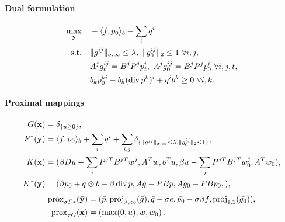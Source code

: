 \paragraph{Dual formulation}
\begin{align*}
    \max_{\mathbf{y}} \quad
        & - \langle f, p_0 \rangle_b - \sum_i q^i \\
    \text{s.t.}\quad
        & \|g^{ij}\|_{\sigma,\infty} \leq \lambda,~
          \|g_0^{ij}\|_{2} \leq 1 ~\forall i,j, \\
        & A^j g^{ij}_t = B^j P^j p^i_t,~
          A^j g_0^{ij} = B^j P^j p_0^i ~\forall i,j,t, \\
        & b_k p_0^{ki} - b_k (\operatorname{div} p^k)^i + q^i b^k \geq 0 ~\forall i, k.
\end{align*}

\paragraph{Proximal mappings}
\begin{align*}
    G(\mathbf{x}) &= \delta_{\{u \geq 0\}}, \\
    F^*(\mathbf{y}) &= \langle f, p_0 \rangle_b + \sum_{i} q^i
        + \sum_{i,j} \delta_{\{
            \|g^{ij}\|_{\sigma,\infty} \leq \lambda,
            \|g_0^{ij}\|_{2} \leq 1
        \}}, \\
    K(\mathbf{x}) &= (
        \beta Du - \sum_j P^{jT}B^{jT}w^{j},
        A^T w,
        b^T u,
        \beta u - \sum_j P^{jT}B^{jT}w_0^{j},
        A^T w_0
    ), \\
    K^*(\mathbf{y}) &= (
        \beta p_0 + q \otimes b - \beta \operatorname{div}{p},
        A g - PBp,
        A g_0 - PB p_0,
    ),
\end{align*}
\begin{align*}
    \operatorname{prox}_{\sigma F*}(\bar{\mathbf{y}})
    &= (
        \bar{p},
        \operatorname{proj}_{\lambda,\infty}(\bar{g}),
        \bar{q}-\sigma e,
        \bar{p_0} - \sigma \beta f,
        \operatorname{proj}_{1,2}(\bar{g_0})
    ), \\
    \operatorname{prox}_{\tau G}(\bar{\mathbf{x}})
    &= \left(
        \max(0,\bar{u}),
        \bar{w},
        \bar{w_0}
    \right).
\end{align*}
